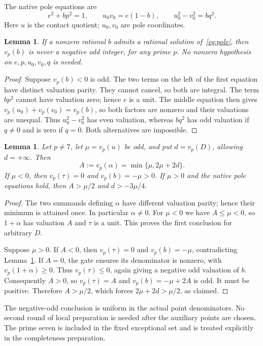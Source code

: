 \documentclass[11pt,a4paper]{article}
\newtheorem{lemma}[theorem]{Lemma}
\begin{document}
The native pole equations are
\begin{equation}\label{eq:pole}
 e^2+bp^2=1,\qquad u_0v_0=e(1-b),\qquad u_0^2-v_0^2=bq^2.
\end{equation}
Here $u$ is the contact quotient; $u_0,v_0$ are pole coordinates.

\begin{lemma}\label{lem:pole-obstruction}
If a nonzero rational $b$ admits a rational solution of~\eqref{eq:pole},
then $v_p(b)$ is never a negative odd integer, for any prime $p$.
No nonzero hypothesis on $e,p,u_0,v_0,q$ is needed.
\end{lemma}
\begin{proof}
Suppose $v_p(b)<0$ is odd. The two terms on the left of the first
equation have distinct valuation parity. They cannot cancel, so both
are integral. The term $bp^2$ cannot have valuation zero; hence $e$
is a unit. The middle equation then gives
$v_p(u_0)+v_p(v_0)=v_p(b)$, so both factors are nonzero and their
valuations are unequal. Thus $u_0^2-v_0^2$ has even valuation, whereas
$bq^2$ has odd valuation if $q\ne0$ and is zero if $q=0$.
Both alternatives are impossible.
\end{proof}

\begin{lemma}\label{lem:normalizer}
Let $p\ne7$, let $\mu=v_p(u)$ be odd, and put $d=v_p(D)$, allowing
$d=+\infty$. Then
\[
 A:=v_p(\alpha)=\min\{\mu,2\mu+2d\}.
\]
If $\mu<0$, then $v_p(\tau)=0$ and $v_p(b)=-\mu>0$.
If $\mu>0$ and the native pole equations hold, then
$A>\mu/2$ and $d>-3\mu/4$.
\end{lemma}
\begin{proof}
The two summands defining $\alpha$ have different valuation parity;
hence their minimum is attained once. In particular $\alpha\ne0$.
For $\mu<0$ we have $A\le\mu<0$, so $1+\alpha$ has valuation $A$
and $\tau$ is a unit. This proves the first conclusion for arbitrary $D$.

Suppose $\mu>0$. If $A<0$, then $v_p(\tau)=0$ and $v_p(b)=-\mu$,
contradicting Lemma~\ref{lem:pole-obstruction}. If $A=0$, the gate
ensures its denominator is nonzero, with $v_p(1+\alpha)\ge0$.
Thus $v_p(\tau)\le0$, again giving a negative odd valuation of $b$.
Consequently $A>0$, so $v_p(\tau)=A$ and
$v_p(b)=-\mu+2A$ is odd. It must be positive. Therefore
$A>\mu/2$, which forces $2\mu+2d>\mu/2$, as claimed.
\end{proof}

The negative-odd conclusion is uniform in the actual point denominators.
No second round of local preparation is needed after the auxiliary points
are chosen. The prime seven is included in the fixed exceptional set and
is treated explicitly in the completeness preparation.
\end{document}
